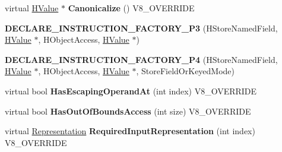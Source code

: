 \begin{DoxyCompactItemize}
\item 
\hypertarget{classv8_1_1internal_1_1_v8___f_i_n_a_l_aad5f871e0a6782c02e742ec017eca3cd}{}virtual \hyperlink{classv8_1_1internal_1_1_h_value}{H\+Value} $\ast$ {\bfseries Canonicalize} () V8\+\_\+\+O\+V\+E\+R\+R\+I\+D\+E\label{classv8_1_1internal_1_1_v8___f_i_n_a_l_aad5f871e0a6782c02e742ec017eca3cd}

\item 
\hypertarget{classv8_1_1internal_1_1_v8___f_i_n_a_l_a2e4e86dde68e518d26b5f0d6a8ff9e84}{}{\bfseries D\+E\+C\+L\+A\+R\+E\+\_\+\+I\+N\+S\+T\+R\+U\+C\+T\+I\+O\+N\+\_\+\+F\+A\+C\+T\+O\+R\+Y\+\_\+\+P3} (H\+Store\+Named\+Field, \hyperlink{classv8_1_1internal_1_1_h_value}{H\+Value} $\ast$, H\+Object\+Access, \hyperlink{classv8_1_1internal_1_1_h_value}{H\+Value} $\ast$)\label{classv8_1_1internal_1_1_v8___f_i_n_a_l_a2e4e86dde68e518d26b5f0d6a8ff9e84}

\item 
\hypertarget{classv8_1_1internal_1_1_v8___f_i_n_a_l_a65bacdcf2a6b8be731b82b9d1d659c6b}{}{\bfseries D\+E\+C\+L\+A\+R\+E\+\_\+\+I\+N\+S\+T\+R\+U\+C\+T\+I\+O\+N\+\_\+\+F\+A\+C\+T\+O\+R\+Y\+\_\+\+P4} (H\+Store\+Named\+Field, \hyperlink{classv8_1_1internal_1_1_h_value}{H\+Value} $\ast$, H\+Object\+Access, \hyperlink{classv8_1_1internal_1_1_h_value}{H\+Value} $\ast$, Store\+Field\+Or\+Keyed\+Mode)\label{classv8_1_1internal_1_1_v8___f_i_n_a_l_a65bacdcf2a6b8be731b82b9d1d659c6b}

\item 
\hypertarget{classv8_1_1internal_1_1_v8___f_i_n_a_l_ae559b1a39de93c2925ab5815da490738}{}virtual bool {\bfseries Has\+Escaping\+Operand\+At} (int index) V8\+\_\+\+O\+V\+E\+R\+R\+I\+D\+E\label{classv8_1_1internal_1_1_v8___f_i_n_a_l_ae559b1a39de93c2925ab5815da490738}

\item 
\hypertarget{classv8_1_1internal_1_1_v8___f_i_n_a_l_a739f7cc8aef8467db65a9d9989fb5e4f}{}virtual bool {\bfseries Has\+Out\+Of\+Bounds\+Access} (int size) V8\+\_\+\+O\+V\+E\+R\+R\+I\+D\+E\label{classv8_1_1internal_1_1_v8___f_i_n_a_l_a739f7cc8aef8467db65a9d9989fb5e4f}

\item 
\hypertarget{classv8_1_1internal_1_1_v8___f_i_n_a_l_a6c6d1f37f40b113d8f4062f1ffff7215}{}virtual \hyperlink{classv8_1_1internal_1_1_representation}{Representation} {\bfseries Required\+Input\+Representation} (int index) V8\+\_\+\+O\+V\+E\+R\+R\+I\+D\+E\label{classv8_1_1internal_1_1_v8___f_i_n_a_l_a6c6d1f37f40b113d8f4062f1ffff7215}


\end{DoxyCompactItemize}

